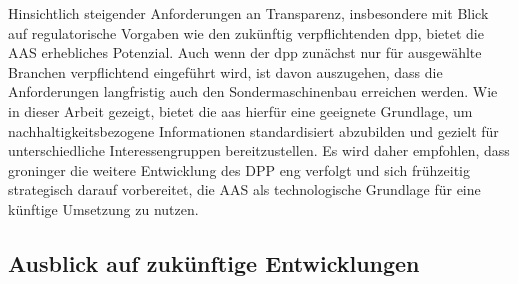 Hinsichtlich steigender Anforderungen an Transparenz, insbesondere mit Blick auf regulatorische Vorgaben wie den zukünftig verpflichtenden \acs{dpp}, bietet die AAS erhebliches Potenzial. 
Auch wenn der \acs{dpp} zunächst nur für ausgewählte Branchen verpflichtend eingeführt wird, ist davon auszugehen, dass die Anforderungen langfristig auch den Sondermaschinenbau erreichen werden. 
Wie in dieser Arbeit gezeigt, bietet die \acs{aas} hierfür eine geeignete Grundlage, um nachhaltigkeitsbezogene Informationen standardisiert abzubilden und gezielt für unterschiedliche Interessengruppen bereitzustellen. 
Es wird daher empfohlen, dass groninger die weitere Entwicklung des DPP eng verfolgt und sich frühzeitig strategisch darauf vorbereitet, die AAS als technologische Grundlage für eine künftige Umsetzung zu nutzen.

\subsection{Ausblick auf zukünftige Entwicklungen}





